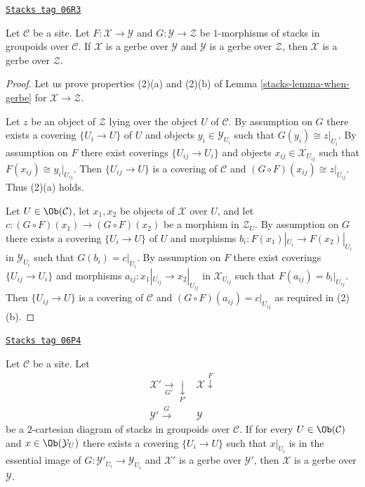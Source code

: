 \begin{lemma}
\label{stacks-lemma-composition-gerbe}
\href{https://stacks.math.columbia.edu/tag/06R3}{\texttt{Stacks tag 06R3}}

Let $\mathcal{C}$ be a site. Let
$F : \mathcal{X} \to \mathcal{Y}$ and $G : \mathcal{Y} \to \mathcal{Z}$
be $1$-morphisms of stacks in groupoids over $\mathcal{C}$.
If $\mathcal{X}$ is a gerbe over $\mathcal{Y}$ and
$\mathcal{Y}$ is a gerbe over $\mathcal{Z}$, then
$\mathcal{X}$ is a gerbe over $\mathcal{Z}$.
\end{lemma}

\begin{proof}

Let us prove properties (2)(a) and (2)(b) of
Lemma \ref{stacks-lemma-when-gerbe}
for $\mathcal{X} \to \mathcal{Z}$.

\medskip\noindent
Let $z$ be an object of $\mathcal{Z}$ lying over the object $U$
of $\mathcal{C}$. By assumption on $G$ there exists
a covering $\{U_i \to U\}$ of $U$ and objects
$y_i \in \mathcal{Y}_{U_i}$ such that $G(y_i) \cong z|_{U_i}$.
By assumption on $F$ there exist coverings $\{U_{ij} \to U_i\}$
and objects $x_{ij} \in \mathcal{X}_{U_{ij}}$ such that
$F(x_{ij}) \cong y_i|_{U_{ij}}$.
Then $\{U_{ij} \to U\}$ is a covering of $\mathcal{C}$
and $(G \circ F)(x_{ij}) \cong z|_{U_{ij}}$. Thus (2)(a) holds.

\medskip\noindent
Let $U \in \Ob(\mathcal{C})$, let $x_1, x_2$ be objects of
$\mathcal{X}$ over $U$, and let
$c : (G \circ F)(x_1) \to (G \circ F)(x_2)$ be a morphism in
$\mathcal{Z}_U$. By assumption on $G$ there exists
a covering $\{U_i \to U\}$ of $U$ and morphisms
$b_i : F(x_1)|_{U_i} \to F(x_2)|_{U_i}$ in $\mathcal{Y}_{U_i}$
such that $G(b_i) = c|_{U_i}$.
By assumption on $F$ there exist coverings $\{U_{ij} \to U_i\}$
and morphisms $a_{ij} : x_1|_{U_{ij}} \to x_2|_{U_{ij}}$ in
$\mathcal{X}_{U_{ij}}$ such that $F(a_{ij}) = b_i|_{U_{ij}}$.
Then $\{U_{ij} \to U\}$ is a covering of $\mathcal{C}$
and $(G \circ F)(a_{ij}) = c|_{U_{ij}}$ as required in (2)(b).
\end{proof}

\begin{lemma}
\label{stacks-lemma-gerbe-descent}
\href{https://stacks.math.columbia.edu/tag/06P4}{\texttt{Stacks tag 06P4}}

Let $\mathcal{C}$ be a site. Let
$$
\begin{array}{cc}\mathcal{X}' \underset{G'}{\longrightarrow}\underset{F'}{\downarrow} & \mathcal{X} \overset{F}{\downarrow} \\ \mathcal{Y}' \overset{G}{\longrightarrow} & \mathcal{Y}\end{array}
$$
be a $2$-cartesian diagram of stacks in groupoids over $\mathcal{C}$.
If for every $U \in \Ob(\mathcal{C})$ and
$x \in \Ob(\mathcal{Y}_U)$ there exists a covering
$\{U_i \to U\}$ such that $x|_{U_i}$ is in the essential
image of $G : \mathcal{Y}'_{U_i} \to \mathcal{Y}_{U_i}$ and
$\mathcal{X}'$ is a gerbe over $\mathcal{Y}'$, then
$\mathcal{X}$ is a gerbe over $\mathcal{Y}$.
\end{lemma}

